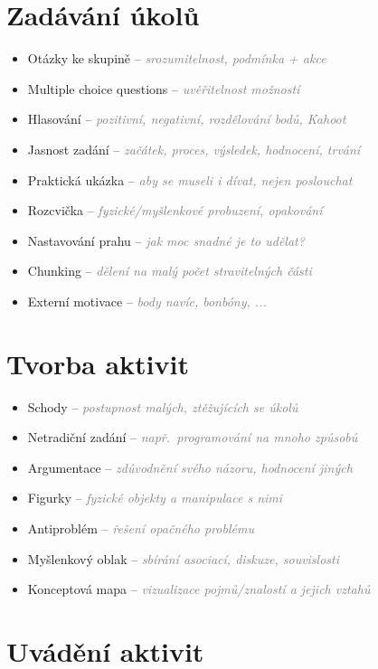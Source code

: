 \documentclass[twoside,openany]{book}
\newcommand{\note}[1]{\textcolor{gray}{\small\itshape #1}}
\begin{document}
\section*{Zadávání úkolů}

\begin{itemize}
\item Otázky ke skupině -- \note{srozumitelnost, podmínka + akce}
\item Multiple choice questions -- \note{uvěřitelnost možností}
\item Hlasování -- \note{pozitivní, negativní, rozdělování bodů, Kahoot}
\item Jasnost zadání -- \note{začátek, proces, výsledek, hodnocení, trvání}
\item Praktická ukázka -- \note{aby se museli i dívat, nejen poslouchat}
\item Rozcvička -- \note{fyzické/myšlenkové probuzení, opakování}
\item Nastavování prahu -- \note{jak moc snadné je to udělat?}
\item Chunking -- \note{dělení na malý počet stravitelných části}
\item Externí motivace -- \note{body navíc, bonbóny, ...}
\end{itemize}

\section*{Tvorba aktivit}

\begin{itemize}
\item Schody -- \note{postupnost malých, ztěžujících se úkolů}
\item Netradiční zadání -- \note{např.\ programování na mnoho způsobů}
\item Argumentace -- \note{zdůvodnění svého názoru, hodnocení jiných}
\item Figurky -- \note{fyzické objekty a manipulace s nimi}
\item Antiproblém -- \note{řešení opačného problému}
\item Myšlenkový oblak -- \note{sbírání asociací, diskuze, souvislosti}
\item Konceptová mapa -- \note{vizualizace pojmů/znalostí a jejich vztahů}
\end{itemize}

\section*{Uvádění aktivit}
\end{document}
